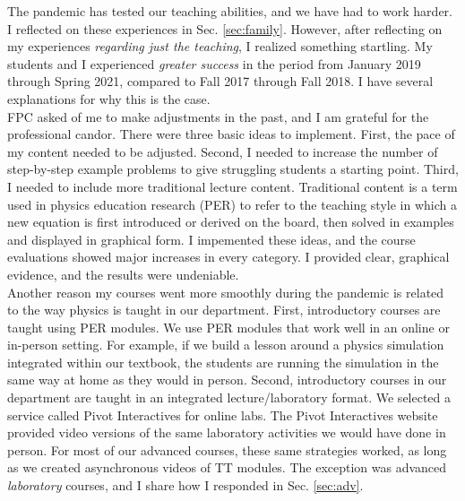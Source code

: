 \documentclass[../../../main.tex]{subfiles}
\begin{document}
The pandemic has tested our teaching abilities, and we have had to work harder.  I reflected on these experiences in Sec. \ref{sec:family}.  However, after reflecting on my experiences \textit{regarding just the teaching}, I realized something startling.  My students and I experienced \textit{greater success} in the period from January 2019 through Spring 2021, compared to Fall 2017 through Fall 2018.  I have several explanations for why this is the case.
\\
\vspace{0.15cm}
FPC asked of me to make adjustments in the past, and I am grateful for the professional candor.  There were three basic ideas to implement.  First, the pace of my content needed to be adjusted.  Second, I needed to increase the number of step-by-step example problems to give struggling students a starting point.  Third, I needed to include more traditional lecture content.  Traditional content is a term used in physics education research (PER) to refer to the teaching style in which a new equation is first introduced or derived on the board, then solved in examples and displayed in graphical form.  I impemented these ideas, and the course evaluations showed major increases in every category.  I provided clear, graphical evidence, and the results were undeniable.
\\
\vspace{0.15cm}
Another reason my courses went more smoothly during the pandemic is related to the way physics is taught in our department.  First, introductory courses are taught using PER modules.  We use PER modules that work well in an online or in-person setting.  For example, if we build a lesson around a physics simulation integrated within our textbook, the students are running the simulation in the same way at home as they would in person.  Second, introductory courses in our department are taught in an integrated lecture/laboratory format.  We selected a service called Pivot Interactives for online labs.  The Pivot Interactives website provided video versions of the same laboratory activities we would have done in person.  For most of our advanced courses, these same strategies worked, as long as we created asynchronous videos of TT modules.  The exception was advanced \textit{laboratory} courses, and I share how I responded in Sec. \ref{sec:adv}.
\\
\vspace{0.15cm}
\end{document}
